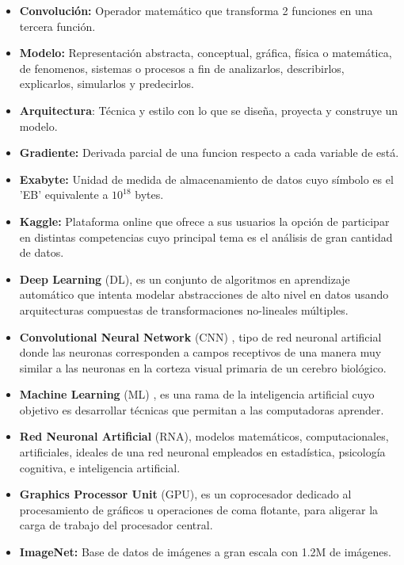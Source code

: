 \begin{itemize}
\item \textbf{Convolución:} Operador matemático que transforma 2 funciones en una tercera función.
\item \textbf{Modelo:} Representación abstracta, conceptual, gráfica, física o matemática, de
fenomenos, sistemas o procesos a fin de analizarlos, describirlos, explicarlos, simularlos
y predecirlos.
\item \textbf{Arquitectura}: Técnica y estilo con lo que se diseña, proyecta y construye un modelo.
\item 
\textbf{Gradiente:} Derivada parcial de una funcion respecto a cada variable de está.

\item \textbf{Exabyte:} Unidad de medida de almacenamiento de datos cuyo símbolo es el 'EB' equivalente a $10^18$ bytes.

\item \textbf{Kaggle:} Plataforma online que ofrece a sus usuarios la opción de participar en distintas
competencias cuyo principal tema es el análisis de gran cantidad de datos.


\item \textbf{Deep Learning} (DL), es un conjunto de algoritmos en aprendizaje automático que intenta
modelar abstracciones de alto nivel en datos usando arquitecturas compuestas de
transformaciones no-lineales múltiples.



\item \textbf{Convolutional Neural Network} (CNN) , tipo de red neuronal artificial donde las neuronas
corresponden a campos receptivos de una manera muy similar a las neuronas en la corteza
visual primaria de un cerebro biológico.

\item \textbf{Machine Learning} (ML) , es una rama de la inteligencia artificial cuyo objetivo es
desarrollar técnicas que permitan a las computadoras aprender.


\item \textbf{Red Neuronal Artificial} (RNA), modelos matemáticos, computacionales, artificiales,
ideales de una red neuronal empleados en estadística, psicología cognitiva, e inteligencia
artificial.


\item \textbf{ Graphics Processor Unit} (GPU), es un coprocesador dedicado al procesamiento de
gráficos u operaciones de coma flotante, para aligerar la carga de trabajo del procesador
central.

\item \textbf{ImageNet:} Base de datos de imágenes a gran escala con 1.2M de imágenes.


\end{itemize}